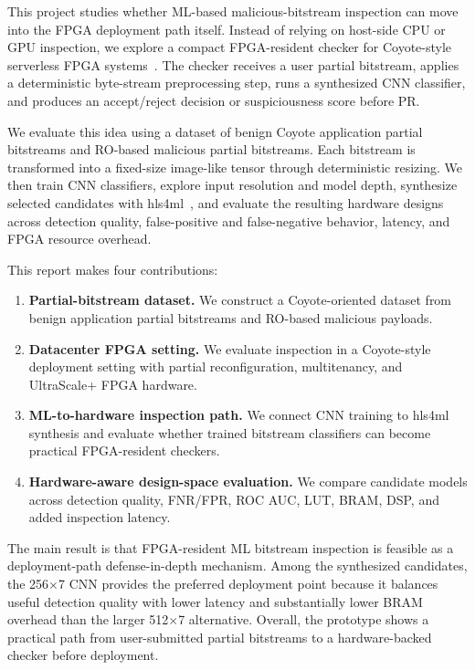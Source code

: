This project studies whether ML-based malicious-bitstream inspection can move into the FPGA deployment path itself. Instead of relying on host-side CPU or GPU inspection, we explore a compact FPGA-resident checker for Coyote-style serverless FPGA systems~\cite{korolija2020os,ramhorst2025coyote}. The checker receives a user partial bitstream, applies a deterministic byte-stream preprocessing step, runs a synthesized CNN classifier, and produces an accept/reject decision or suspiciousness score before PR.

We evaluate this idea using a dataset of benign Coyote application partial bitstreams and RO-based malicious partial bitstreams. Each bitstream is transformed into a fixed-size image-like tensor through deterministic resizing. We then train CNN classifiers, explore input resolution and model depth, synthesize selected candidates with hls4ml~\cite{duarte2018fast,aarrestad2021fast}, and evaluate the resulting hardware designs across detection quality, false-positive and false-negative behavior, latency, and FPGA resource overhead.

This report makes four contributions:

\begin{enumerate}
    \item \textbf{Partial-bitstream dataset.}
    We construct a Coyote-oriented dataset from benign application partial bitstreams and RO-based malicious payloads.

    \item \textbf{Datacenter FPGA setting.}
    We evaluate inspection in a Coyote-style deployment setting with partial reconfiguration, multitenancy, and UltraScale+ FPGA hardware.

    \item \textbf{ML-to-hardware inspection path.}
    We connect CNN training to hls4ml synthesis and evaluate whether trained bitstream classifiers can become practical FPGA-resident checkers.

    \item \textbf{Hardware-aware design-space evaluation.}
    We compare candidate models across detection quality, FNR/FPR, ROC AUC, LUT, BRAM, DSP, and added inspection latency.
\end{enumerate}

The main result is that FPGA-resident ML bitstream inspection is feasible as a deployment-path defense-in-depth mechanism. Among the synthesized candidates, the 256$\times$7 CNN provides the preferred deployment point because it balances useful detection quality with lower latency and substantially lower BRAM overhead than the larger 512$\times$7 alternative. Overall, the prototype shows a practical path from user-submitted partial bitstreams to a hardware-backed checker before deployment.
